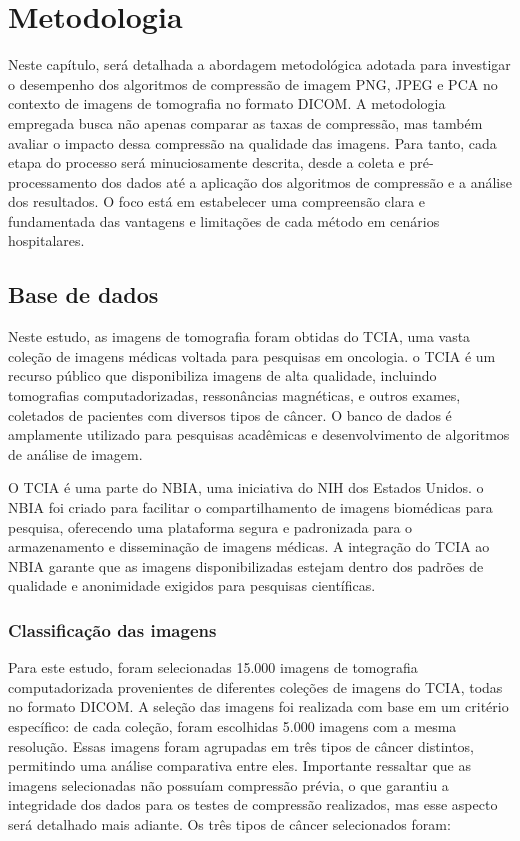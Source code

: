 \chapter{Metodologia}
\label{cap:metod}

Neste capítulo, será detalhada a abordagem metodológica adotada para investigar  o desempenho dos algoritmos de compressão de imagem \acrshort{PNG}, \acrshort{JPEG} e \acrshort{PCA} no contexto de imagens de tomografia no formato \acrshort{DICOM}. A metodologia empregada busca não apenas comparar as taxas de compressão, mas também avaliar o impacto dessa compressão na qualidade das imagens. Para tanto, cada etapa do processo será minuciosamente descrita, desde a coleta e pré-processamento dos dados até a aplicação dos algoritmos de compressão e a análise dos resultados. O foco está em estabelecer uma compreensão clara e fundamentada das vantagens e limitações de cada método em cenários hospitalares.

\section{Base de dados}
\label{metod:dados}

Neste estudo, as imagens de tomografia foram obtidas do \acrfull{TCIA}, uma vasta coleção de imagens médicas voltada para pesquisas em oncologia. o \acrshort{TCIA} é um recurso público que disponibiliza imagens de alta qualidade, incluindo tomografias computadorizadas, ressonâncias magnéticas, e outros exames, coletados de pacientes com diversos tipos de câncer. O banco de dados é amplamente utilizado para pesquisas acadêmicas e desenvolvimento de algoritmos de análise de imagem.

O \acrshort{TCIA} é uma parte do \acrfull{NBIA}, uma iniciativa do \acrfull{NIH} dos Estados Unidos. o \acrshort{NBIA} foi criado para facilitar o compartilhamento de imagens biomédicas para pesquisa, oferecendo uma plataforma segura e padronizada para o armazenamento e disseminação de imagens médicas. A integração do \acrshort{TCIA} ao \acrshort{NBIA} garante que as imagens disponibilizadas estejam dentro dos padrões de qualidade e anonimidade exigidos para pesquisas científicas.

\subsection{Classificação das imagens}
Para este estudo, foram selecionadas 15.000 imagens de tomografia computadorizada provenientes de diferentes coleções de imagens do \acrfull{TCIA}, todas no formato \acrshort{DICOM}. A seleção das imagens foi realizada com base em um critério específico: de cada coleção, foram escolhidas 5.000 imagens com a mesma resolução. Essas imagens foram agrupadas em três tipos de câncer distintos, permitindo uma análise comparativa entre eles. Importante ressaltar que as imagens selecionadas não possuíam compressão prévia, o que garantiu a integridade dos dados para os testes de compressão realizados, mas esse aspecto será detalhado mais adiante. Os três tipos de câncer selecionados foram:

